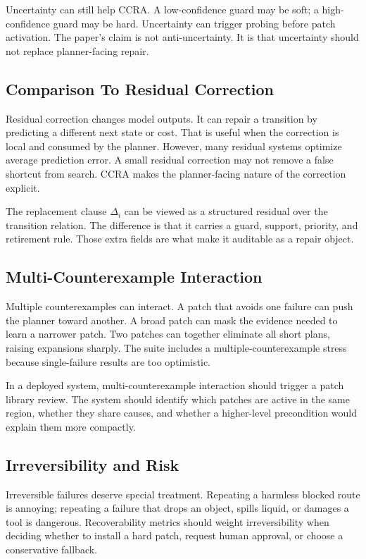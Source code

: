 \documentclass{article}
\newcommand{\ccra}{\textsc{CCRA}}
\newcommand{\patch}{\Delta}
\begin{document}
Uncertainty can still help \ccra{}. A low-confidence guard may be soft; a
high-confidence guard may be hard. Uncertainty can trigger probing before patch
activation. The paper's claim is not anti-uncertainty. It is that uncertainty
should not replace planner-facing repair.

\subsection{Comparison To Residual Correction}

Residual correction changes model outputs. It can repair a transition by
predicting a different next state or cost. That is useful when the correction is
local and consumed by the planner. However, many residual systems optimize
average prediction error. A small residual correction may not remove a false
shortcut from search. \ccra{} makes the planner-facing nature of the correction
explicit.

The replacement clause $\patch_i$ can be viewed as a structured residual over
the transition relation. The difference is that it carries a guard, support,
priority, and retirement rule. Those extra fields are what make it auditable as
a repair object.

\subsection{Multi-Counterexample Interaction}

Multiple counterexamples can interact. A patch that avoids one failure can push
the planner toward another. A broad patch can mask the evidence needed to learn
a narrower patch. Two patches can together eliminate all short plans, raising
expansions sharply. The suite includes a multiple-counterexample stress because
single-failure results are too optimistic.

In a deployed system, multi-counterexample interaction should trigger a patch
library review. The system should identify which patches are active in the same
region, whether they share causes, and whether a higher-level precondition
would explain them more compactly.

\subsection{Irreversibility and Risk}

Irreversible failures deserve special treatment. Repeating a harmless blocked
route is annoying; repeating a failure that drops an object, spills liquid, or
damages a tool is dangerous. Recoverability metrics should weight
irreversibility when deciding whether to install a hard patch, request human
approval, or choose a conservative fallback.
\end{document}
